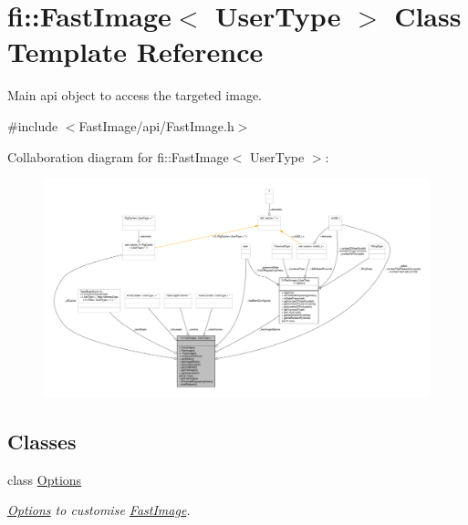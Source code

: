 \hypertarget{classfi_1_1FastImage}{}\section{fi\+:\+:Fast\+Image$<$ User\+Type $>$ Class Template Reference}
\label{classfi_1_1FastImage}


Main api object to access the targeted image.  




{\ttfamily \#include $<$Fast\+Image/api/\+Fast\+Image.\+h$>$}



Collaboration diagram for fi\+:\+:Fast\+Image$<$ User\+Type $>$\+:
\nopagebreak
\begin{figure}[H]
\begin{center}
\leavevmode
\includegraphics[width=350pt]{da/d55/classfi_1_1FastImage__coll__graph}
\end{center}
\end{figure}
\subsection*{Classes}
\begin{DoxyCompactItemize}
\item 
class \hyperlink{classfi_1_1FastImage_1_1Options}{Options}
\begin{DoxyCompactList}\small\item\em \hyperlink{classfi_1_1FastImage_1_1Options}{Options} to customise \hyperlink{classfi_1_1FastImage}{Fast\+Image}. \end{DoxyCompactList}\end{DoxyCompactItemize}
